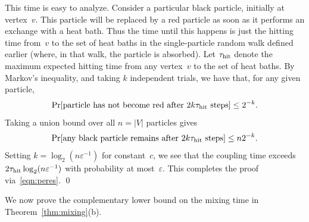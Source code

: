 \documentclass[11pt]{article}
\theoremstyle{plain}
\theoremstyle{definition}
\theoremstyle{remark}
\numberwithin{equation}{section}
\newcommand{\hit}{\tau_{\rm hit}}
\newenvironment{proofof}[1]{{\par\bigskip\noindent \em Proof of #1.}\/}{\hfill\qed\bigskip}
\begin{document}
\begin{proofof}{Theorem~\ref{thm:mixing}(a)}
This time is easy to analyze.  Consider a particular black particle, initially at vertex~$v$.  This
particle will be replaced by a red particle as soon as it performs an exchange with a heat bath.  
Thus the time until this happens is just the hitting time from~$v$ to the set of heat
baths in the single-particle random walk defined earlier (where, in that walk, the particle is
absorbed).  Let $\hit$ denote the maximum expected hitting time from any vertex~$v$ to
the set of heat baths.
By Markov's inequality, and taking $k$ independent trials, we have that, for any given particle, $$
   \Pr[\hbox{\rm particle has not become red after $2k\hit$ steps}] \le 2^{-k}.  $$
Taking a union bound over all $n=|V|$ particles gives $$
   \Pr[\hbox{\rm any black particle remains after $2k\hit$ steps}] \le n2^{-k}.  $$
Setting $k = \log_2(n\varepsilon^{-1})$ for constant~$c$, we see that the coupling time exceeds
$2\hit\log_2(n\varepsilon^{-1})$ with probability at most~$\varepsilon$.  This completes the proof via~\eqref{eqn:peres}.
\end{proofof}

We now prove the complementary lower bound on the mixing time in Theorem~\ref{thm:mixing}(b).
\end{document}
